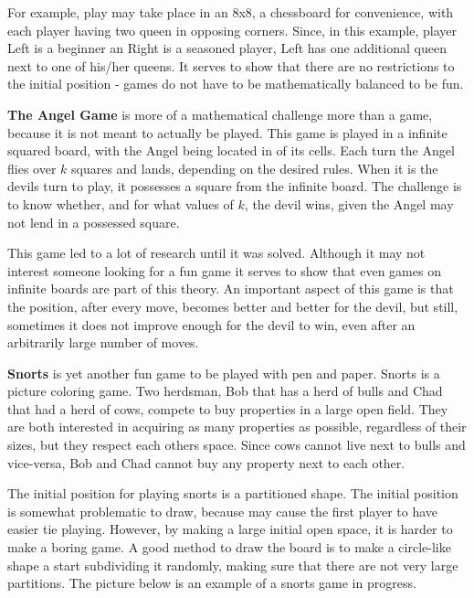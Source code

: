 
For example, play may take place in an 8x8, a chessboard for convenience, with each player having two queen in opposing corners. Since, in this example, player Left is a beginner an Right is a seasoned player, Left has one additional queen next to one of his/her queens. It serves to show that there are no restrictions to the initial position - games do not have to be mathematically balanced to be fun.


\textbf{The Angel Game} is more of a mathematical challenge more than a game, because it is not meant to actually be played. This game is played in a infinite squared board, with the Angel being located in of its cells. Each turn the Angel flies over $k$ squares and lands, depending on the desired rules. When it is the devils turn to play, it possesses a square from the infinite board. The challenge is to know whether, and for what values of $k$, the devil wins, given the Angel may not lend in a possessed square.

This game led to a lot of research until it was solved. Although it may not interest someone looking for a fun game it serves to show that even games on infinite boards are part of this theory. An important aspect of this game is that the position, after every move, becomes better and better for the devil, but still, sometimes it does not improve enough for the devil to win, even after an arbitrarily large number of moves.

\textbf{Snorts} is yet another fun game to be played with pen and paper. Snorts is a picture coloring game. Two herdsman, Bob that has a herd of bulls and Chad that had a herd of cows, compete to buy properties in a large open field. They are both interested in acquiring as many properties as possible, regardless of their sizes, but they respect each others space. Since cows cannot live next to bulls and vice-versa, Bob and Chad cannot buy any property next to each other.

The initial position for playing snorts is a partitioned shape. The initial position is somewhat problematic to draw, because may cause the first player to have easier tie playing. However, by making a large initial open space, it is harder to make a boring game. A good method to draw the board is to make a circle-like shape a start subdividing it randomly, making sure that there are not very large partitions. The picture below is an example of a snorts game in progress.

